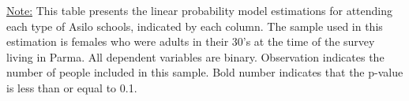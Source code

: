 \begin{footnotesize}
\noindent\underline{Note:} This table presents the linear probability model estimations for attending each type of Asilo schools, indicated by each column. The sample used in this estimation is females who were adults in their 30's at the time of the survey living in Parma. All dependent variables are binary. Observation indicates the number of people included in this sample. Bold number indicates that the p-value is less than or equal to 0.1.
\end{footnotesize}

